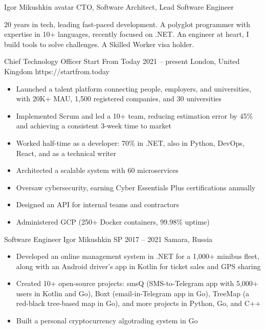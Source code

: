 \documentclass[9pt,a4paper]{juicv}
\begin{document}
\begin{paracol}{2}
\cvHeader
    {Igor Mikushkin}
    {avatar}
    {CTO, Software Architect, Lead Software Engineer}

20 years in tech, leading fast-paced development.
A polyglot programmer with expertise in 10+ languages, recently focused on .NET.
An engineer at heart, I build tools to solve challenges.
A Skilled Worker visa holder.

    \cvLeftEvent
        {Chief Technology Officer}
        {Start From Today}
        {2021 -- present}
        {London, United Kingdom}
        {https://startfrom.today}

        \begin{itemize}
            \item Launched a talent platform connecting people, employers, and universities,
                  with 20K+ MAU, 1,500 registered companies, and 30 universities
            \item Implemented Scrum and led a 10+ team,
                  reducing estimation error by 45\%
                  and achieving a consistent 3-week time to market
            \item Worked half-time as a developer: 70\% in .NET,
                  also in Python, DevOps, React, and as a technical writer
            \item Architected a scalable system with 60 microservices
            \item Oversaw cybersecurity, earning Cyber Essentials Plus certifications annually
            \item Designed an API for internal teams and contractors
            \item Administered GCP (250+ Docker containers, 99.98\% uptime)
        \end{itemize}

    \cvLeftEvent
        {Software Engineer}
        {Igor Mikushkin SP}
        {2017 -- 2021}
        {Samara, Russia}
        {}

        \begin{itemize}
            \item Developed an online management system in .NET for a 1,000+ minibus fleet,
                  along with an Android driver’s app in Kotlin for ticket sales and GPS sharing
            \item Created 10+ open-source projects:
                  smsQ (SMS-to-Telegram app with 5,000+ users in Kotlin and Go),
                  Boxt (email-in-Telegram app in Go),
                  TreeMap (a red-black tree-based map in Go),
                  and more projects in Python, Go, and C++
            \item Built a personal cryptocurrency algotrading system in Go
        \end{itemize}


\end{paracol}
\end{document}
